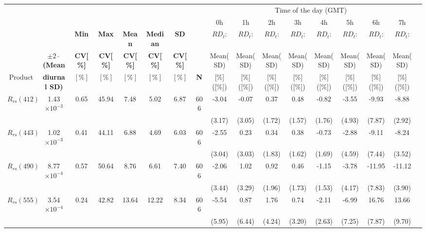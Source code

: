 \documentclass[preview]{standalone}
\begin{document}
\scriptsize
\centering
\setlength\tabcolsep{1.5pt} %
\begin{tabular}{ccccccccccccccccc} \hline
 &&&&&&  &  &   \multicolumn{8}{c}{Time of the day (GMT)} &   \\ \cline{9-16}
 &&&&&& &  &    0h    & 1h  &  2h  &  3h  &  4h  &  5h  &  6h   &  7h &   \\ 
   &  & \bfseries{Min} & \bfseries{Max} & \bfseries{Mean} & \bfseries{Median} & \bfseries{SD} &  &    $RD_t$:    & $RD_t$:  &  $RD_t$:  &  $RD_t$:  &  $RD_t$:  &  $RD_t$:  &  $RD_t$:   &  $RD_t$:  \\ 
   & \bfseries{$\pm2\cdot$(Mean} & \bfseries{CV[\%]} & \bfseries{CV[\%]} & \bfseries{CV[\%]} & \bfseries{CV[\%]} & \bfseries{CV[\%]} &  &    Mean(SD)    & Mean(SD)  &  Mean(SD)  &  Mean(SD)  &  Mean(SD)  &  Mean(SD)  &  Mean(SD)   &  Mean(SD) &  \\ 
Product  & \bfseries{diurnal SD)}  & $[\%]$ & $[\%]$ & $[\%]$ & $[\%]$ & $[\%]$  & \bfseries{N} &    [\%]([\%])    & [\%]([\%])  &  [\%]([\%])  &  [\%]([\%])  &  [\%]([\%])  &  [\%]([\%])  &  [\%]([\%])   &  [\%]([\%])   \\ \hline \hline
$R_{rs}(412)$ 	& 1.43$\times10^{-3}$ 	& 0.65 	&  45.94	&  7.48 &  5.02 &  6.87 & 606  	&  -3.04	& -0.07 	& 0.37  	& 0.48    	& -0.82  	& -3.55 	& -9.93  	& -8.88  	\\
 				&						&		&			&		&		&		&		& (3.17) 	& (3.05) 	& (1.72) 	& (1.57) 	& (1.76) 	& (4.93) 	& (7.87) 	& (2.92) 	\\ \hline
$R_{rs}(443)$ 	& 1.02$\times10^{-3}$ 	& 0.41 	&  44.11 	&  6.88 &  4.69 &  6.03 & 606  	&  -2.55  	&  0.23 	& 0.34  	& 0.38    	& -0.73  	& -2.88  	& -9.11   	& -8.24   	\\ 
 				&						&		&			&		&		&		&		& (3.04) 	& (3.03) 	& (1.83) 	& (1.62) 	& (1.69) 	& (4.59) 	& (7.44) 	& (3.52) 	\\ \hline
$R_{rs}(490)$ 	& 8.77$\times10^{-4}$ 	& 0.57 	&  50.64 	&  8.76 &  6.61 &  7.40 & 606  	&  -2.06  	&  1.02 	&   0.92 	& 0.46    	& -1.15  	& -3.78  	& -11.95  	& -11.12  	\\
 				&						&		&			&		&		&		&		& (3.44) 	& (3.29) 	& (1.96) 	& (1.73) 	& (1.53) 	& (4.17) 	& (7.83) 	& (3.90) 	\\ \hline
$R_{rs}(555)$ 	& 3.54$\times10^{-4}$ 	& 0.24 	&  42.82 	& 13.64 & 12.22 &  8.34 & 606  	& -5.54   	&  0.87 	&  1.76  	& 0.74    	&-2.11   	& -6.99  	& 16.76   	& 13.66  	\\
 				&						&		&			&		&		&		&		& (5.95) 	& (6.44) 	& (4.24) 	& (3.20) 	& (2.63) 	& (7.25) 	& (7.87) 	& (9.70) 	\\ \hline

\end{tabular}
\end{document}
